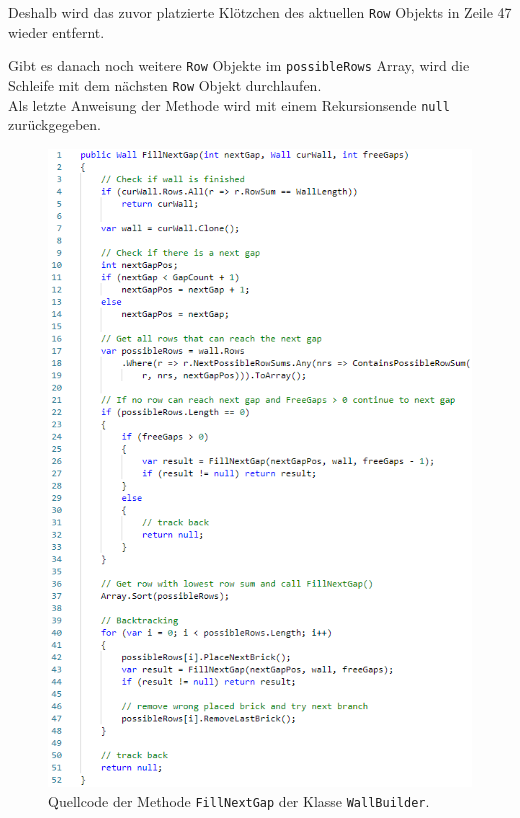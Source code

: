 \documentclass[a4paper,12pt]{article}
\newcommand{\code}{\texttt}
\begin{document}
Deshalb wird das zuvor platzierte Klötzchen des aktuellen \code{Row} Objekts in Zeile 47 wieder entfernt.

Gibt es danach noch weitere \code{Row} Objekte im \code{possibleRows} Array, wird die Schleife mit dem nächsten \code{Row} Objekt durchlaufen.
\\[0.4cm]
Als letzte Anweisung der Methode wird mit einem Rekursionsende \code{null} zurückgegeben.
\begin{figure}[H]
    \centering
    \includegraphics[width=.86\linewidth]{Bilder/Aufgabe1/Code.png}
    \caption{Quellcode der Methode \code{FillNextGap} der Klasse \code{WallBuilder}.}
\end{figure}
\end{document}
